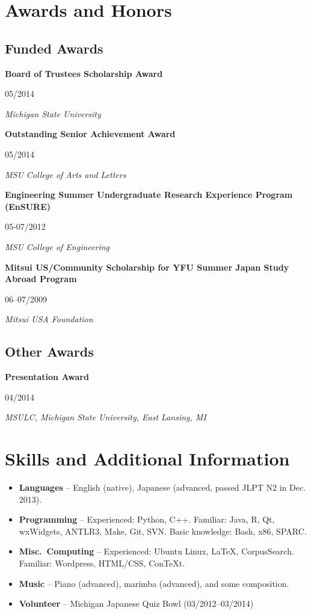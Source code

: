 \documentclass[10pt,oneside]{article}
\newcommand{\ressection}[1]{
	\vspace{-12pt}
	\section*{#1}
}
\newcommand{\ressubsection}[1]{
	\subsection*{#1}
	\vspace{-4pt}
}
\newcommand{\resitem}[2]{
	\item \parbox[t]{0.8\textwidth}{#1} \hfill #2
}
\newcommand{\resbigitem}[4]{
	\item \parbox[t]{0.8\textwidth}{\textbf{#1}} \hfill #2 \\
		\parbox[t]{0.8\textwidth}{\textit{#3}} \hfill \textit{#4}
}
\begin{document}
\ressection{Awards and Honors}
	
\ressubsection{Funded Awards}
\begin{reslist}
	\resbigitem{Board of Trustees Scholarship Award}
		{05/2014}
		{Michigan State University}
		{}
	\resbigitem{Outstanding Senior Achievement Award}
		{05/2014}
		{MSU College of Arts and Letters }
		{}
	\resbigitem{Engineering Summer Undergraduate Research Experience Program (EnSURE)}
		{05-07/2012}
		{MSU College of Engineering}
		{}
	\resbigitem{Mitsui US/Community Scholarship for YFU Summer Japan Study Abroad Program}
		{06--07/2009}
		{Mitsui USA Foundation}
		{}
\end{reslist}

\ressubsection{Other Awards}
\begin{reslist}
	\resbigitem{Presentation Award}
		{04/2014}
		{MSULC, Michigan State University, East Lansing, MI}
		{}
\end{reslist}



\ressection{Skills and Additional Information}

\begin{itemize}
	\item \textbf{Languages} -- English (native), Japanese (advanced, passed JLPT N2 in Dec. 2013).
	
	\item \textbf{Programming} -- Experienced: Python, C++. Familiar: Java, R, Qt, wxWidgets, ANTLR3, Make, Git, SVN. Basic knowledge: Bash, x86, SPARC.
	
	\item \textbf{Misc.\ Computing} -- Experienced: Ubuntu Linux, \LaTeX{}, CorpusSearch. Familiar: Wordpress, HTML/CSS, ConTeXt.
	
	\item \textbf{Music} --  Piano (advanced), marimba (advanced), and some composition.
	
	\item \textbf{Volunteer} -- Michigan Japanese Quiz Bowl (03/2012--03/2014)
\end{itemize}
\end{document}
